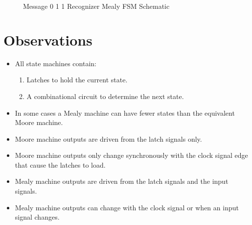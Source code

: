 \documentclass[10pt,letterpaper]{article}
\begin{document}
\begin{figure}[ht]
\centering
{}
\caption{Message 0 1 1 Recognizer Mealy FSM Schematic}
\label{schematic:mealy.message.011}
\end{figure}




\FloatBarrier
\newpage

\section{Observations}

\begin{itemize}
\item All state machines contain:
	\begin{enumerate}
	\item Latches to hold the current state.
	\item A combinational circuit to determine the next state.
	\end{enumerate}
\item In some cases a Mealy machine can have fewer states than the equivalent Moore machine.
\item Moore machine outputs are driven from the latch signals only.
\item Moore machine outputs only change synchronously with the clock signal 
	edge that cause the latches to load.
\item Mealy machine outputs are driven from the latch signals and the input signals.
\item Mealy machine outputs can change with the clock signal or when an 
	input signal changes.
\end{itemize}
\end{document}

